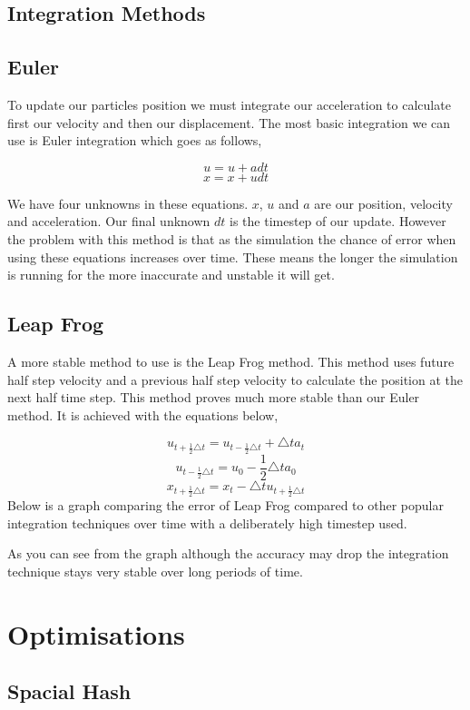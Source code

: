  \subsection*{Integration Methods }

\subsection*{Euler }

To update our particles position we must integrate our acceleration to calculate first our velocity and then our displacement. The most basic integration we can use is Euler integration which goes as follows,\par
 \[ u = u + adt \] \[ x = x + udt \]

We have four unknowns in these equations. $x$, $u$ and $a$ are our position, velocity and acceleration. Our final unknown $dt$ is the timestep of our update. However the problem with this method is that as the simulation the chance of error when using these equations increases over time. These means the longer the simulation is running for the more inaccurate and unstable it will get. \subsection*{Leap Frog }

A more stable method to use is the Leap Frog method. This method uses future half step velocity and a previous half step velocity to calculate the position at the next half time step. This method proves much more stable than our Euler method. It is achieved with the equations below,\par
 \[ u_{t+\frac{1}{2} \triangle t} = u_{t- \frac{1}{2} \triangle t} + \triangle t a_t \] \[ u_{t-\frac{1}{2} \triangle t} = u_0 - \frac{1}{2}\triangle t a_0 \] \[ x_{t+\frac{1}{2} \triangle t} = x_t - \triangle tu_{t+\frac{1}{2} \triangle t} \] Below is a graph comparing the error of Leap Frog compared to other popular integration techniques over time with a deliberately high timestep used.\par
As you can see from the graph although the accuracy may drop the integration technique stays very stable over long periods of time.

\section*{Optimisations }

\subsection*{Spacial Hash }

